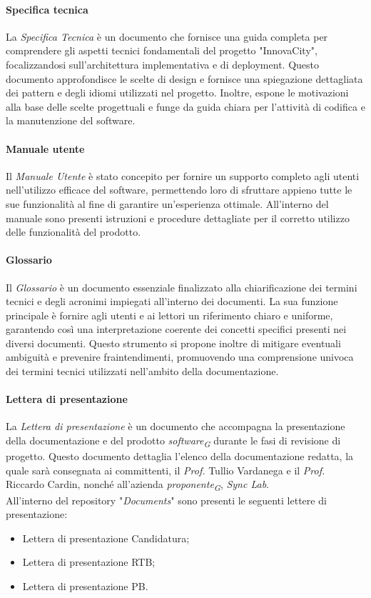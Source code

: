 \paragraph{Specifica tecnica}
La \textit{Specifica Tecnica} è un documento che fornisce una guida completa per comprendere gli aspetti tecnici fondamentali del progetto "InnovaCity", focalizzandosi sull'architettura implementativa e di deployment. Questo documento approfondisce le scelte di design e fornisce una spiegazione dettagliata dei pattern e degli idiomi utilizzati nel progetto. Inoltre, espone le motivazioni alla base delle scelte progettuali e funge da guida chiara per l'attività di codifica e la manutenzione del software.

\paragraph{Manuale utente}
Il \textit{Manuale Utente} è stato concepito per fornire un supporto completo agli utenti nell’utilizzo efficace del software, permettendo loro di sfruttare appieno tutte le sue funzionalità al fine di garantire un’esperienza ottimale. All'interno del manuale sono presenti istruzioni e procedure dettagliate per il corretto utilizzo delle funzionalità del prodotto.

\paragraph{Glossario}
Il \textit{Glossario} è un documento essenziale finalizzato alla chiarificazione dei termini tecnici e degli acronimi impiegati all'interno dei documenti. La sua funzione principale è fornire agli utenti e ai lettori un riferimento chiaro e uniforme, garantendo così una interpretazione coerente dei concetti specifici presenti nei diversi documenti. Questo strumento si propone inoltre di mitigare eventuali ambiguità e prevenire fraintendimenti, promuovendo una comprensione univoca dei termini tecnici utilizzati nell'ambito della documentazione.

\paragraph{Lettera di presentazione}
La \textit{Lettera di presentazione} è un documento che accompagna la presentazione della documentazione e del prodotto \textit{software}\textsubscript{\textit{G}} durante le fasi di revisione di progetto. Questo documento dettaglia l'elenco della documentazione redatta, la quale sarà consegnata ai committenti, il \textit{Prof.} Tullio Vardanega e il \textit{Prof.} Riccardo Cardin, nonché all'azienda \textit{proponente}\textsubscript{\textit{G}}, \textit{Sync Lab}. \\
All'interno del repository "\textit{Documents}" sono presenti le seguenti lettere di presentazione:
\begin{itemize}
    \item Lettera di presentazione Candidatura;
    \item Lettera di presentazione RTB;
    \item Lettera di presentazione PB.
\end{itemize}

